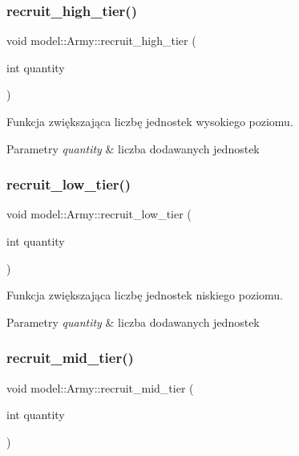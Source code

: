 \subsubsection{\texorpdfstring{recruit\+\_\+high\+\_\+tier()}{recruit\_high\_tier()}}
{\footnotesize\ttfamily void model\+::\+Army\+::recruit\+\_\+high\+\_\+tier (\begin{DoxyParamCaption}\item[{int}]{quantity }\end{DoxyParamCaption})\hspace{0.3cm}{\ttfamily [inline]}}

Funkcja zwiększająca liczbę jednostek wysokiego poziomu. 
\begin{DoxyParams}{Parametry}
{\em quantity} & liczba dodawanych jednostek \\
\hline
\end{DoxyParams}
\mbox{\label{classmodel_1_1Army_a64148705305e62116c2f8feb170a917d}} 
\subsubsection{\texorpdfstring{recruit\+\_\+low\+\_\+tier()}{recruit\_low\_tier()}}
{\footnotesize\ttfamily void model\+::\+Army\+::recruit\+\_\+low\+\_\+tier (\begin{DoxyParamCaption}\item[{int}]{quantity }\end{DoxyParamCaption})\hspace{0.3cm}{\ttfamily [inline]}}

Funkcja zwiększająca liczbę jednostek niskiego poziomu. 
\begin{DoxyParams}{Parametry}
{\em quantity} & liczba dodawanych jednostek \\
\hline
\end{DoxyParams}
\mbox{\label{classmodel_1_1Army_a30f4b8e102f400969a86bebbfeb9bbb3}} 
\subsubsection{\texorpdfstring{recruit\+\_\+mid\+\_\+tier()}{recruit\_mid\_tier()}}
{\footnotesize\ttfamily void model\+::\+Army\+::recruit\+\_\+mid\+\_\+tier (\begin{DoxyParamCaption}\item[{int}]{quantity }\end{DoxyParamCaption})\hspace{0.3cm}{\ttfamily [inline]}}

